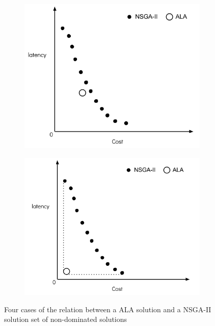 \documentclass[twoside]{article}
\begin{document}
\begin{figure}[H]
	\begin{subfigure}[b]{0.4\textwidth}
		\includegraphics[width=\textwidth]{pics/3.png}
		\caption{}
	\end{subfigure}
	\begin{subfigure}[b]{0.4\textwidth}
		\includegraphics[width=\textwidth]{pics/4.png}
		\caption{}
	\end{subfigure}
	\caption{Four cases of the relation between a ALA solution and a NSGA-II solution set of non-dominated solutions}\label{fig:Pareto}
\label{fig:Pareto}
\end{figure}
\end{document}
